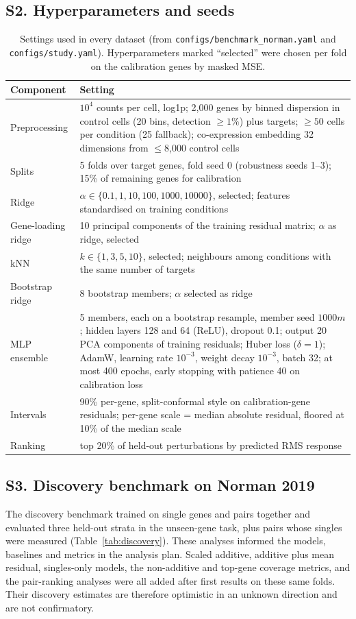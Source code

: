 \subsection*{S2. Hyperparameters and seeds}
\begin{table}[H]
\centering\scriptsize
\caption{Settings used in every dataset (from \texttt{configs/benchmark\_norman.yaml} and \texttt{configs/study.yaml}). Hyperparameters marked ``selected'' were chosen per fold on the calibration genes by masked MSE.}
\label{tab:grids}
\begin{tabularx}{\linewidth}{lX}
\toprule
Component & Setting \\
\midrule
Preprocessing & $10^4$ counts per cell, log1p; 2{,}000 genes by binned dispersion in control cells (20 bins, detection $\ge1\%$) plus targets; $\ge50$ cells per condition (25 fallback); co-expression embedding 32 dimensions from $\le$8{,}000 control cells \\
Splits & 5 folds over target genes, fold seed 0 (robustness seeds 1--3); 15\% of remaining genes for calibration \\
Ridge & $\alpha\in\{0.1,1,10,100,1000,10000\}$, selected; features standardised on training conditions \\
Gene-loading ridge & 10 principal components of the training residual matrix; $\alpha$ as ridge, selected \\
kNN & $k\in\{1,3,5,10\}$, selected; neighbours among conditions with the same number of targets \\
Bootstrap ridge & 8 bootstrap members; $\alpha$ selected as ridge \\
MLP ensemble & 5 members, each on a bootstrap resample, member seed $1000m$; hidden layers 128 and 64 (ReLU), dropout 0.1; output 20 PCA components of training residuals; Huber loss ($\delta=1$); AdamW, learning rate $10^{-3}$, weight decay $10^{-3}$, batch 32; at most 400 epochs, early stopping with patience 40 on calibration loss \\
Intervals & 90\% per-gene, split-conformal style on calibration-gene residuals; per-gene scale = median absolute residual, floored at 10\% of the median scale \\
Ranking & top 20\% of held-out perturbations by predicted RMS response \\
\bottomrule
\end{tabularx}
\end{table}

\subsection*{S3. Discovery benchmark on Norman 2019}
The discovery benchmark trained on single genes and pairs together and evaluated three held-out strata in the unseen-gene task, plus pairs whose singles were measured (Table~\ref{tab:discovery}). These analyses informed the models, baselines and metrics in the analysis plan. Scaled additive, additive plus mean residual, singles-only models, the non-additive and top-gene coverage metrics, and the pair-ranking analyses were all added after first results on these same folds. Their discovery estimates are therefore optimistic in an unknown direction and are not confirmatory.

